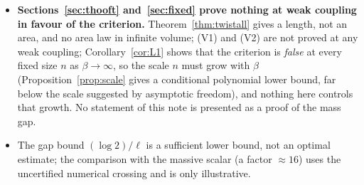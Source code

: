 \documentclass[11pt,a4paper]{article}
\theoremstyle{plain}
\theoremstyle{definition}
\theoremstyle{remark}
\numberwithin{equation}{section}
\begin{document}
\begin{itemize}
\item \textbf{Sections~\ref{sec:thooft} and~\ref{sec:fixed} prove nothing at weak coupling in favour of the criterion.} Theorem~\ref{thm:twistall} gives a length, not an area, and no area law in infinite volume; (V1) and (V2) are not proved at any weak coupling; Corollary~\ref{cor:L1} shows that the criterion is \emph{false} at every fixed size $n$ as $\beta\to\infty$, so the scale $n$ must grow with $\beta$ (Proposition~\ref{prop:scale} gives a conditional polynomial lower bound, far below the scale suggested by asymptotic freedom), and nothing here controls that growth. No statement of this note is presented as a proof of the mass gap.
\item The gap bound $(\log2)/\ell$ is a sufficient lower bound, not an optimal estimate; the comparison with the massive scalar (a factor
$\approx16$) uses the uncertified numerical crossing and is only illustrative.
\end{itemize}
\end{document}
